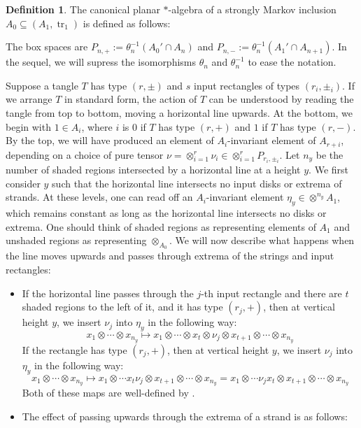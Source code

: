 \documentclass[11pt]{article}
\theoremstyle{plain}
\theoremstyle{definition}
\newtheorem{defn}[thm]{Definition}
\DeclareMathOperator{\tr}{tr}
\begin{document}
\begin{defn} 
The canonical planar $\ast$-algebra of a strongly Markov inclusion $A_0\subseteq (A_1,\tr_1)$ is defined as follows:

	The box spaces are $P_{n,+}:=\theta_n^{-1}(A_0'\cap A_{n}) $ and $P_{n,-}:=\theta_n^{-1}(A_1'\cap A_{n+1})$. 
	In the sequel, we will supress the isomorphisms $\theta_n$ and $\theta_n^{-1}$ to ease the notation. 

	Suppose a tangle $T$ has type $(r,\pm)$ and $s$ input rectangles of types $(r_i,\pm_i)$. If we arrange $T$ in standard form, the action of $T$ can be understood by reading the tangle from top to bottom, moving a horizontal line upwards. At the bottom, we begin with $1\in A_i$, where $i$ is $0$ if $T$ has type $(r,+)$ and $1$ if $T$ has type $(r,-)$. By the top, we will have produced an element of $A_i$-invariant element of $A_{r+i}$, depending on a choice of pure tensor $\nu=\otimes_{i=1}^r\nu_i\in\otimes_{i=1}^rP_{r_i,\pm_i}$. Let $n_y$ be the number of shaded regions intersected by a horizontal line at a height $y$. We first consider $y$ such that the horizontal line intersects no input disks or extrema of strands. At these levels, one can read off an $A_i$-invariant element $\eta_y\in \otimes^{n_y}A_1$, which remains constant as long as the horizontal line intersects no disks or extrema. One should think of shaded regions as representing elements of $A_1$ and unshaded regions as representing $\otimes_{A_0}$. We will now describe what happens when the line moves upwards and passes through extrema of the strings and input rectangles:
	\begin{itemize}
	\item If the horizontal line passes through the $j$-th input rectangle and there are $t$ shaded regions to the left of it, and it has type $(r_j,+)$, then at vertical height $y$, we insert $\nu_j$ into $\eta_y$ in the following way:
	\[
	x_1\otimes\cdots \otimes x_{n_y} 
	\mapsto 
	x_1\otimes \cdots\otimes x_t\otimes \nu_j \otimes x_{t+1}\otimes \cdots\otimes x_{n_y}
	\]
	 If the rectangle has type $(r_j,+)$, then at vertical height $y$, we insert $\nu_j$ into	$\eta_y$ in the following way:
	\[
	x_1\otimes\cdots \otimes x_{n_y} 
	\mapsto 
	x_1\otimes \cdots x_t \nu_j \otimes x_{t+1}\otimes \cdots \otimes x_{n_y}
	=
	x_1\otimes \cdots \nu_j x_t  \otimes x_{t+1}\otimes \cdots \otimes x_{n_y}
	\]
	Both of these maps are well-defined by \cite[Lem.~2.29]{MR2812459}.
	\item The effect of passing upwards through the extrema of a strand is as follows: 

\end{itemize}
\end{defn}
\end{document}
